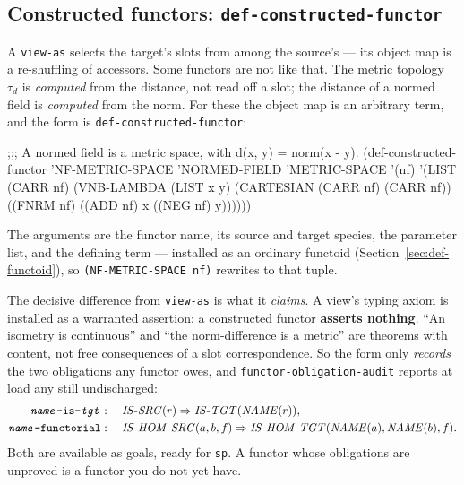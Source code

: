 \subsection{Constructed functors: \texttt{def-constructed-functor}}
\label{sec:constructed-functor}

A \texttt{view-as} selects the target's slots from among the source's --- its
object map is a re-shuffling of accessors.  Some functors are not like that.
The metric topology $\tau_d$ is \emph{computed} from the distance, not read off a
slot; the distance of a normed field is \emph{computed} from the norm.  For these
the object map is an arbitrary term, and the form is
\texttt{def-constructed-functor}:

\begin{VNBcode}
;;; A normed field is a metric space, with d(x, y) = norm(x - y).
(def-constructed-functor 'NF-METRIC-SPACE 'NORMED-FIELD 'METRIC-SPACE '(nf)
  '(LIST (CARR nf)
         (VNB-LAMBDA (LIST x y) (CARTESIAN (CARR nf) (CARR nf)) ((FNRM nf) ((ADD nf) x ((NEG nf) y))))))
\end{VNBcode}

The arguments are the functor name, its source and target species, the
parameter list, and the defining term --- installed as an ordinary functoid
(Section~\ref{sec:def-functoid}), so \texttt{(NF-METRIC-SPACE nf)} rewrites to
that tuple.

The decisive difference from \texttt{view-as} is what it \emph{claims}.  A view's
typing axiom is installed as a warranted assertion; a constructed functor
\textbf{asserts nothing}.  ``An isometry is continuous'' and ``the norm-difference
is a metric'' are theorems with content, not free consequences of a slot
correspondence.  So the form only \emph{records} the two obligations any functor
owes, and \texttt{functor-obligation-audit} reports at load any still
undischarged:
\[
  \begin{aligned}
    \texttt{\textit{name}-is-\textit{tgt}} &:\quad
      \mathit{IS\text{-}SRC}(r) \Rightarrow \mathit{IS\text{-}TGT}(\mathit{NAME}(r)), \\
    \texttt{\textit{name}-functorial} &:\quad
      \mathit{IS\text{-}HOM\text{-}SRC}(a, b, f) \Rightarrow
      \mathit{IS\text{-}HOM\text{-}TGT}(\mathit{NAME}(a), \mathit{NAME}(b), f).
  \end{aligned}
\]
Both are available as goals, ready for \texttt{sp}.  A functor whose obligations
are unproved is a functor you do not yet have.

